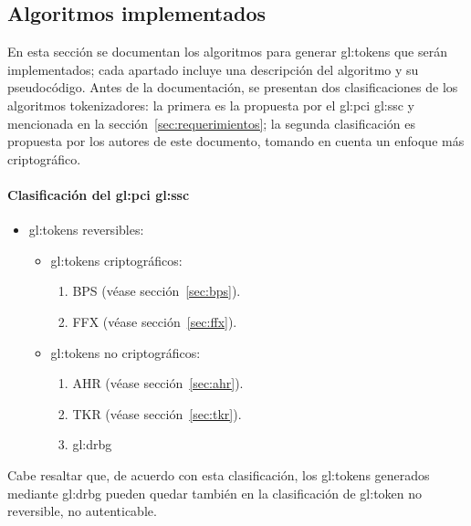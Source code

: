 %
%

\subsection{Algoritmos implementados}

En esta sección se documentan los algoritmos para generar \glspl{gl:token}
que serán implementados; cada apartado incluye una descripción del
algoritmo y su pseudocódigo. Antes de la documentación, se presentan
dos clasificaciones de los algoritmos tokenizadores: la primera es la propuesta
por el \gls{gl:pci} \gls{gl:ssc} y mencionada en la
sección~\ref{sec:requerimientos}; la segunda clasificación es propuesta por los
autores de este documento, tomando en cuenta un enfoque más criptográfico.

\paragraph{Clasificación del \gls{gl:pci} \gls{gl:ssc}}
\begin{itemize}
  \item \Glspl{gl:token} reversibles:
    \begin{itemize}
      \item \Glspl{gl:token} criptográficos:
        \begin{enumerate}
          \item BPS (véase sección~\ref{sec:bps}).
          \item FFX (véase sección~\ref{sec:ffx}).
        \end{enumerate}
      \item \Glspl{gl:token} no criptográficos:
        \begin{enumerate}
          \item AHR (véase sección~\ref{sec:ahr}).
          \item TKR (véase sección~\ref{sec:tkr}).
          \item \gls{gl:drbg}
        \end{enumerate}
    \end{itemize}
\end{itemize}

Cabe resaltar que, de acuerdo con esta clasificación, los \glspl{gl:token}
generados mediante \gls{gl:drbg} pueden quedar también en la clasificación
de \gls{gl:token} no reversible, no autenticable.

